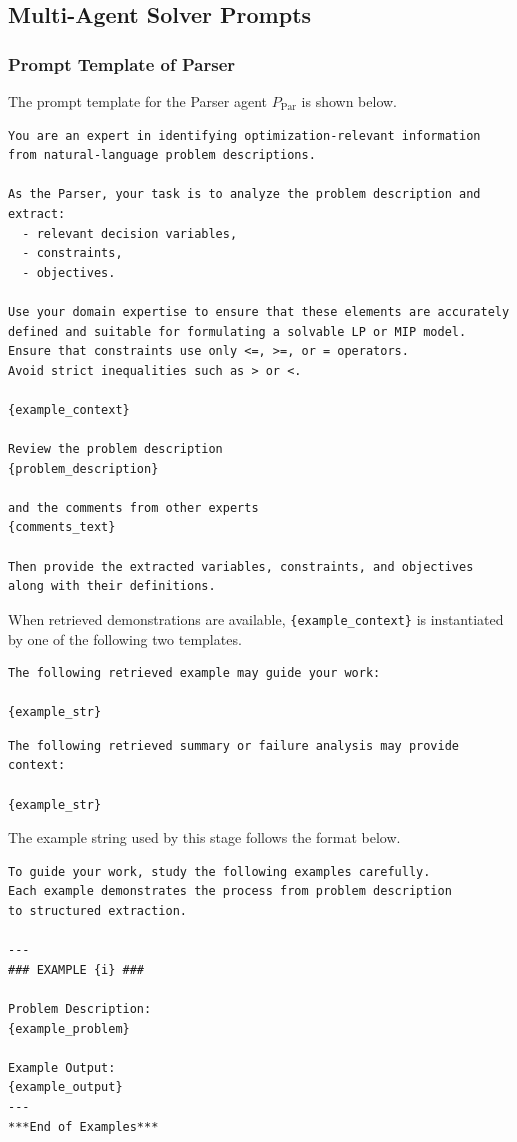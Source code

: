 \subsection{Multi-Agent Solver Prompts}

\subsubsection{Prompt Template of Parser}
\label{app:prompt_parser}

The prompt template for the Parser agent \(P_{\mathrm{Par}}\) is shown below.
\begin{lstlisting}[style=promptstyle]
You are an expert in identifying optimization-relevant information
from natural-language problem descriptions.

As the Parser, your task is to analyze the problem description and extract:
  - relevant decision variables,
  - constraints,
  - objectives.

Use your domain expertise to ensure that these elements are accurately
defined and suitable for formulating a solvable LP or MIP model.
Ensure that constraints use only <=, >=, or = operators.
Avoid strict inequalities such as > or <.

{example_context}

Review the problem description
{problem_description}

and the comments from other experts
{comments_text}

Then provide the extracted variables, constraints, and objectives
along with their definitions.
\end{lstlisting}

When retrieved demonstrations are available, \texttt{\{example\_context\}} is
instantiated by one of the following two templates.
\begin{lstlisting}[style=promptstyle]
The following retrieved example may guide your work:

{example_str}
\end{lstlisting}

\begin{lstlisting}[style=promptstyle]
The following retrieved summary or failure analysis may provide context:

{example_str}
\end{lstlisting}

The example string used by this stage follows the format below.
\begin{lstlisting}[style=promptstyle]
To guide your work, study the following examples carefully.
Each example demonstrates the process from problem description
to structured extraction.

---
### EXAMPLE {i} ###

Problem Description:
{example_problem}

Example Output:
{example_output}
---
***End of Examples***
\end{lstlisting}

